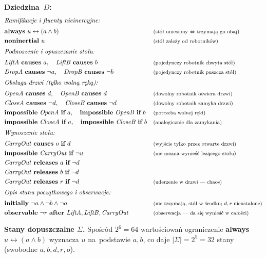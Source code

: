 \documentclass[11pt,a4paper]{article}
\newcommand{\causes}{\textbf{causes}}
\newcommand{\aft}{\textbf{after}}
\renewcommand{\iff}{\textbf{if}}
\newcommand{\initially}{\textbf{initially}}
\newcommand{\always}{\textbf{always}}
\newcommand{\impossible}{\textbf{impossible}}
\newcommand{\releases}{\textbf{releases}}
\newcommand{\noninertial}{\textbf{noninertial}}
\newcommand{\observable}{\textbf{observable}}
\newcommand{\cmt}[1]{\text{\footnotesize\normalfont (#1)}}
\theoremstyle{definition}
\begin{document}
\medskip
\noindent\textbf{Dziedzina~$D$:}
{\small
\begin{align*}
  \shortintertext{\textit{Ramifikacje i~fluenty nieinercyjne:}}
  &\always\ u \leftrightarrow (a \land b)
    && \cmt{stół uniesiony $\Leftrightarrow$ trzymają go obaj} \\
  &\noninertial\ u
    && \cmt{stół zależy od~robotników} \\
  \shortintertext{\textit{Podnoszenie i~opuszczanie stołu:}}
  &\mathit{LiftA}\ \causes\ a,
   \quad \mathit{LiftB}\ \causes\ b
    && \cmt{pojedynczy robotnik chwyta stół} \\
  &\mathit{DropA}\ \causes\ \neg a,
   \quad \mathit{DropB}\ \causes\ \neg b
    && \cmt{pojedynczy robotnik puszcza stół} \\
  \shortintertext{\textit{Obsługa drzwi (tylko wolną ręką):}}
  &\mathit{OpenA}\ \causes\ d,
   \quad \mathit{OpenB}\ \causes\ d
    && \cmt{dowolny robotnik otwiera drzwi} \\
  &\mathit{CloseA}\ \causes\ \neg d,
   \quad \mathit{CloseB}\ \causes\ \neg d
    && \cmt{dowolny robotnik zamyka drzwi} \\
  &\impossible\ \mathit{OpenA}\ \iff\ a,
   \quad \impossible\ \mathit{OpenB}\ \iff\ b
    && \cmt{potrzeba wolnej ręki} \\
  &\impossible\ \mathit{CloseA}\ \iff\ a,
   \quad \impossible\ \mathit{CloseB}\ \iff\ b
    && \cmt{analogicznie dla zamykania} \\
  \shortintertext{\textit{Wynoszenie stołu:}}
  &\mathit{CarryOut}\ \causes\ o\ \iff\ d
    && \cmt{wyjście tylko przez otwarte drzwi} \\
  &\impossible\ \mathit{CarryOut}\ \iff\ \neg u
    && \cmt{nie można wynieść leżącego stołu} \\
  &\mathit{CarryOut}\ \releases\ a\ \iff\ \neg d \\
  &\mathit{CarryOut}\ \releases\ b\ \iff\ \neg d \\
  &\mathit{CarryOut}\ \releases\ r\ \iff\ \neg d
    && \cmt{uderzenie w~drzwi --- chaos} \\
  \shortintertext{\textit{Opis stanu początkowego i~obserwacje:}}
  &\initially\ \neg a \land \neg b \land \neg o
    && \cmt{nie trzymają, stół w~środku; $d,r$ nieustalone} \\
  &\observable\ \neg r\ \aft\ \mathit{LiftA}, \mathit{LiftB}, \mathit{CarryOut}
    && \cmt{obserwacja --- da się wynieść w~całości}
\end{align*}
}

\medskip
\noindent\textbf{Stany dopuszczalne $\Sigma$.}
Spośród $2^6 = 64$ wartościowań ograniczenie \always{} $u \leftrightarrow (a \land b)$
wyznacza $u$ na~podstawie $a, b$, co daje $|\Sigma| = 2^5 = 32$ stany
(swobodne $a, b, d, r, o$).
\end{document}
